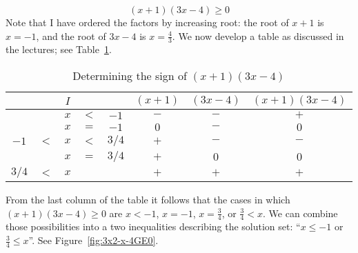 \documentclass{article}
\begin{document}
\begin{enumerate}
\begin{enumerate}
    \begin{equation*}
      (x+1)(3x-4) \ge 0
    \end{equation*}
    Note that I have ordered the factors by increasing root: the root
    of $x+1$ is $x=-1$, and the root of $3x-4$ is $x=\frac{4}{3}$.  We
    now develop a table as discussed in the lectures; see
    Table~\ref{tab:px+1pp3x-4p}.
    \begin{table}[htbp]
      \centering
      \begin{tabular}{|ccccc|c|c|c|}
        \hline
        \multicolumn{5}{|c|}{$I$} & $(x+1)$ & $(3x-4)$ & $(x+1)(3x-4)$ \\
        \hline\hline
        $   $&$ $&$x$&$  <$&$ -1$  & $-$     & $-$      & $+$           \\
        \hline
        $   $&$ $&$x$&$  =$&$ -1$  & $0$     & $-$      & $0$           \\
        \hline
        $ -1$&$<$&$x$&$  <$&$3/4$  & $+$     & $-$      & $-$           \\
        \hline
        $   $&$ $&$x$&$  =$&$3/4$  & $+$     & $0$      & $0$           \\
        \hline
        $3/4$&$<$&$x$&$   $&$   $  & $+$     & $+$      & $+$           \\
        \hline
      \end{tabular}
      \caption{Determining the sign of $(x+1)(3x-4)$}
      \label{tab:px+1pp3x-4p}
    \end{table}
    From the last column of the table it follows that the cases in
    which $(x+1)(3x-4)\ge 0$ are $x<-1$, $x=-1$, $x=\frac{3}{4}$, or
    $\frac{3}{4}<x$.  We can combine those possibilities into a two
    inequalities describing the solution set: ``$x\le-1$ or
    $\frac{3}{4}\le x$''.  See Figure~\ref{fig:3x2-x-4GE0}.
    \begin{figure}[htbp]
      \centering
\end{figure}
\end{enumerate}
\end{enumerate}
\end{document}
